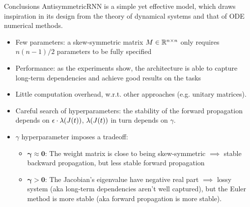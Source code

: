 \documentclass[10pt,xcolor={table,dvipsnames}]{beamer} 		%
\theoremstyle{plain}					%
\theoremstyle{definition}
\theoremstyle{remark}
\begin{document}
	\begin{frame}{Conclusions}
		AntisymmetricRNN is a simple yet effective model, which draws inspiration in its design
		from the theory of dynamical systems and that of ODE numerical methods. 
		\medskip 

		\begin{itemize}
			\item<2-> Few parameters: a skew-symmetric matrix $M\in\R{n}{n}$ only requires $n(n-1)/2$ 
			parameters to be fully specified
			\item<3-> Performance: as the experiments show, the architecture is able to capture long-term 
			dependencies and achieve good results on the tasks
			\item<4-> Little computation overhead, w.r.t. other approaches 
			{\smaller (e.g. unitary matrices)}.
		\end{itemize}

		\begin{itemize}
			\item<5-> Careful search of hyperparameters: {\smaller the stability of the forward 
			propagation depends on $\epsilon\cdot\lambda\qty(J(t))$, 
			$\lambda\qty(J(t))$ in turn depends on $\gamma$.}
			\item<6-> $\gamma$ hyperparameter imposes a tradeoff:
			\begin{itemize}
				\item<7-> {$\bm{\gamma\approx 0}$}: The weight matrix is close to being skew-symmetric
				$\implies$ stable backward propagation, but less stable forward propagation
				\item<8-> {$\bm{\gamma>0}$}: The Jacobian's eigenvalue have negative real part 
				$\implies$ lossy system (aka long-term dependencies aren't well captured), 
				but the Euler method is more stable (aka forward propagation is more stable). 
			\end{itemize} 
		\end{itemize}
	\end{frame}
\end{document}
